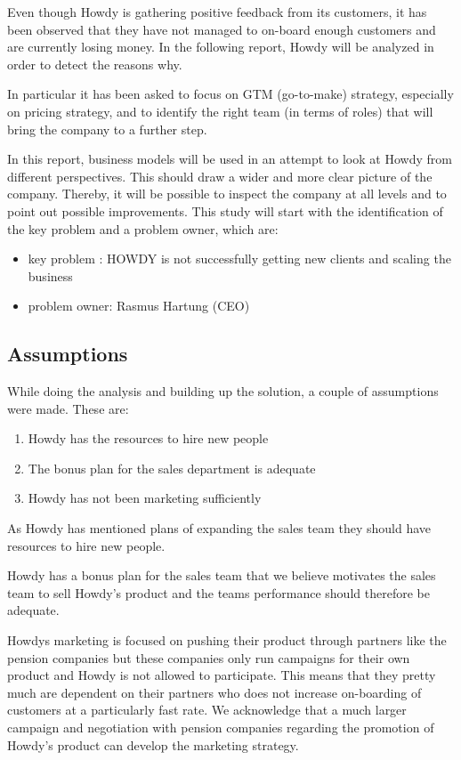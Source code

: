 \noindent Even though Howdy is gathering positive feedback from its customers, it has been observed that they have not managed to on-board enough customers and are currently losing money. In the following report, Howdy will be analyzed in order to detect the reasons why.

\noindent In particular it has been asked to focus on GTM (go-to-make) strategy, especially on pricing strategy, and to identify the right team (in terms of roles) that will bring the company to a further step.\cite[s.39]{oneofthepresentations}

\noindent In this report, business models will be used in an attempt to look at Howdy from different perspectives. This should draw a wider and more clear picture of the company. Thereby, it will be possible to inspect the company at all levels and to point out possible improvements. This study will start with the identification of the key problem and a problem owner, which are:


\begin{itemize}
  \item key problem : HOWDY is not successfully getting new clients and scaling the business\cite[s.38]{oneofthepresentations}
  \item problem owner: Rasmus Hartung (CEO)\cite[s.5]{oneofthepresentations}
\end{itemize}





\subsection{Assumptions}

While doing the analysis and building up the solution, a couple of assumptions were made. These are:

\begin{enumerate}
    \item Howdy has the resources to hire new people 
    \item The bonus plan for the sales department is adequate 
    \item Howdy has not been marketing sufficiently 
\end{enumerate}

\noindent As Howdy has mentioned plans of expanding the sales team they should have resources to hire new people.

\noindent Howdy has a bonus plan for the sales team that we believe motivates the sales team to sell Howdy’s product and the teams performance should therefore be adequate.

\noindent Howdys marketing is focused on pushing their product through partners like the pension companies but these companies only run campaigns for their own product and Howdy is not allowed to participate. This means that they pretty much are dependent on their partners who does not increase on-boarding of customers at a particularly fast rate. We acknowledge that a much larger campaign and negotiation with pension companies regarding the promotion of Howdy’s product can develop the marketing strategy.
